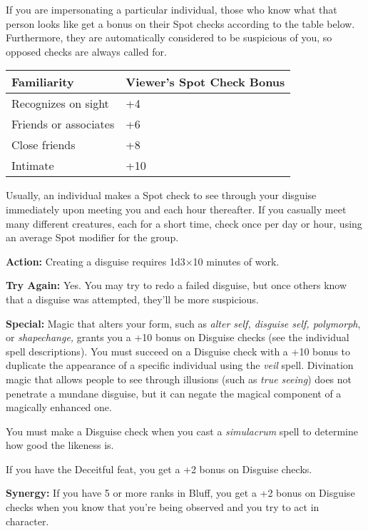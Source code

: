 \documentclass{article}
\begin{document}
\vspace{12pt}
If you are impersonating a particular individual, those who know what that person 
looks like get a bonus on their Spot checks according to the table below. Furthermore, 
they are automatically considered to be suspicious of you, so opposed checks are 
always called for.

\vspace{12pt}
\begin{tabular}{|>{\raggedright}p{82pt}|>{\raggedright}p{60pt}|}
\hline
F\textbf{amiliarity } & V\textbf{iewer's Spot Check Bonus}\tabularnewline
\hline
Recognizes on sight  & +4\tabularnewline
\hline
Friends or associates  & +6\tabularnewline
\hline
Close friends  & +8\tabularnewline
\hline
Intimate  & +10\tabularnewline
\hline
\end{tabular}

\vspace{12pt}
Usually, an individual makes a Spot check to see through your disguise immediately 
upon meeting you and each hour thereafter. If you casually meet many different 
creatures, each for a short time, check once per day or hour, using an average 
Spot modifier for the group. 

\textbf{Action:} Creating a disguise requires 1d3\ensuremath{\times}10 minutes 
of work.

\textbf{Try Again:} Yes. You may try to redo a failed disguise, but once others 
know that a disguise was attempted, they'll be more suspicious.

\textbf{Special:} Magic that alters your form, such as \textit{alter self, disguise 
self, polymorph}, or \textit{shapechange, }grants you a +10 bonus on Disguise checks 
(see the individual spell descriptions). You must succeed on a Disguise check with 
a +10 bonus to duplicate the appearance of a specific individual using the \textit{veil 
}spell. Divination magic that allows people to see through illusions (such as \textit{true 
seeing}) does not penetrate a mundane disguise, but it can negate the magical component 
of a magically enhanced one.

You must make a Disguise check when you cast a \textit{simulacrum }spell to determine 
how good the likeness is.

If you have the Deceitful feat, you get a +2 bonus on Disguise checks.

\textbf{Synergy:} If you have 5 or more ranks in Bluff, you get a +2 bonus on Disguise 
checks when you know that you're being observed and you try to act in character.
\end{document}
